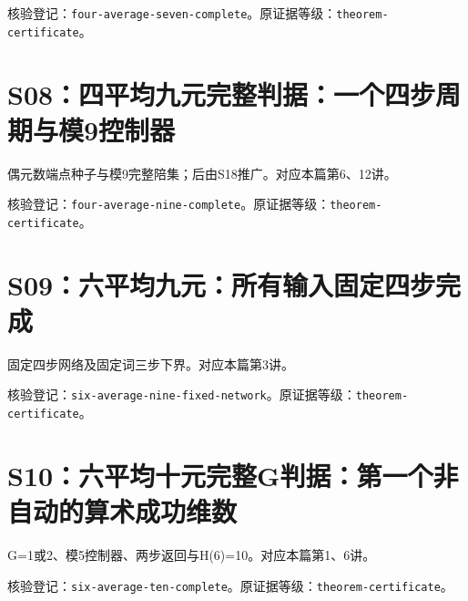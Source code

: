 \documentclass[11pt,a4paper,oneside,openany]{book}
\theoremstyle{definition}\newtheorem{example}[theorem]{例}\newtheorem{conjecture}[theorem]{猜想}
\numberwithin{equation}{chapter}\setcounter{tocdepth}{1}
\begin{document}
\par{}\par

核验登记：{\small\nolinkurl{four-average-seven-complete}}。原证据等级：{\small\nolinkurl{theorem-certificate}}。

\section{S08：四平均九元完整判据：一个四步周期与模9控制器}\label{source:S08}

偶元数端点种子与模9完整陪集；后由S18推广。对应本篇第6、12讲。

\par{}\par

核验登记：{\small\nolinkurl{four-average-nine-complete}}。原证据等级：{\small\nolinkurl{theorem-certificate}}。

\section{S09：六平均九元：所有输入固定四步完成}\label{source:S09}

固定四步网络及固定词三步下界。对应本篇第3讲。

\par{}\par

核验登记：{\small\nolinkurl{six-average-nine-fixed-network}}。原证据等级：{\small\nolinkurl{theorem-certificate}}。

\section{S10：六平均十元完整G判据：第一个非自动的算术成功维数}\label{source:S10}

G=1或2、模5控制器、两步返回与H(6)=10。对应本篇第1、6讲。

\par{}\par

核验登记：{\small\nolinkurl{six-average-ten-complete}}。原证据等级：{\small\nolinkurl{theorem-certificate}}。
\end{document}
